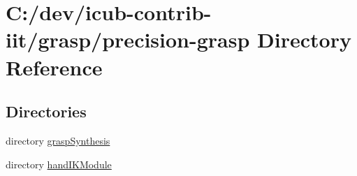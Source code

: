 \section{C\+:/dev/icub-\/contrib-\/iit/grasp/precision-\/grasp Directory Reference}
\label{dir_2c47baf97a0f2f5e35770cdbd12fc695}
\subsection*{Directories}
\begin{DoxyCompactItemize}
\item 
directory \hyperlink{dir_6ea4152d040292e3f8e7b7a946b5e9bb}{grasp\+Synthesis}
\item 
directory \hyperlink{dir_b92e3a4e9c15618f0a122ef59fa44425}{hand\+I\+K\+Module}
\end{DoxyCompactItemize}
